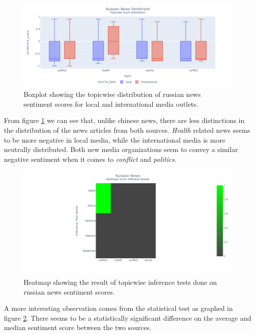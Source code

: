 \documentclass{article}
\theoremstyle{mytheoremstyle}
\theoremstyle{mytheoremstyle}
\theoremstyle{myproblemstyle}
\begin{document}
    \begin{figure}[hp]
        \centering
        \includegraphics[width=\linewidth]{../images/plots/Russia/russia_boxplot_sentiment.png}
        \caption{Boxplot showing the topicwise distribution of russian news sentiment scores for local and international media outlets.}
        \label{fig:russia_sentiment_score_boxplot}
    \end{figure}  

    From figure \ref{fig:russia_sentiment_score_boxplot} we can see that, unlike chinese news, there are less distinctions in the distribution of the news articles from both sources. \emph{Health} related news seems to be more negative in local media, while the international media is more neutrally distributed. Both new media organizations seem to convey a similar negative sentiment when it comes to \emph{conflict} and \emph{politics}.

    \begin{figure}[hp]
        \centering
        \includegraphics[width=\linewidth]{../images/plots/Russia/russia_heatmap_inference_sentiment.png}
        \caption{Heatmap showing the result of topicwise inference tests done on russian news sentiment scores.}
        \label{fig:russia_sentiment_score_heatmap}
    \end{figure}

    A more interesting observation comes from the statistical test as graphed in figure \ref{fig:russia_sentiment_score_heatmap}. There seems to be a statistically significant difference on the average and median sentiment score between the two sources. 
\end{document}
